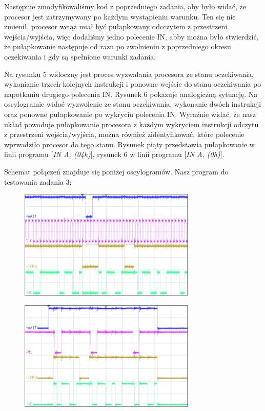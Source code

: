 \documentclass[fleqn]{article}
\begin{document}
Następnie zmodyfikowaliśmy kod z poprzedniego zadania, aby było widać, że procesor jest zatrzymywany po każdym wystąpieniu warunku. Ten się nie zmienił, procesor wciąż miał być pułapkowany odcczytem z przestrzeni wejścia/wyjścia, więc dodaliśmy jedno polecenie IN, abby można było stwierdzić, że pułapkowanie następuje od razu po zwolnieniu z poprzedniego okresu oczekiwania i gdy są spełnione warunki zadania.

Na rysunku $5$ widoczny jest proces wyzwalania procesora ze stanu oczekiwania, wykonianie trzech kolejnych instrukcji i ponowne wejście do stanu oczekiwania po napotkaniu drugiego polecenia IN. Rysunek $6$ pokazuje analogiczną sytuację. Na oscylogramie widać wyzwolenie ze stanu oczekiwania, wykonanie dwóch instrukcji oraz ponowne pułapkowanie po wykryciu polecenia IN.
Wyraźnie widać, że nasz układ powoduje pułapkowanie procesora z każdym wykryciem instrukcji odczytu z przestrzeni wejścia/wyjścia, można również zidentyfikować, które polecenie wprwadziło procesor do tego stanu. Rysunek piąty przedstawia pułapkowanie w linii programu [\textit{IN A, (04h)}], rysunek 6 w linii programu [\textit{IN A, (0h)}].

Schemat połączeń znajduje się poniżej oscylogramów. Nasz program do testowania zadania 3:




\begin{figure}[H]
	\centering
	\includegraphics[width=0.75\textwidth]{img/3a.png}
	\caption{}
\end{figure}

\begin{figure}[H]
	\centering
	\includegraphics[width=0.75\textwidth]{img/3b.png}
	\caption{}
\end{figure}
\end{document}
